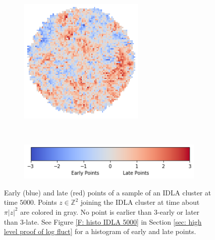 \documentclass[11pt]{article}
\numberwithin{equation}{section}
\begin{document}
\begin{figure}[H]
  \centering
  \captionsetup{width=.9\linewidth}
  \begin{subfigure} {0.85 \textwidth}
      \includegraphics[width=\linewidth]{idla_5001.png}
  \end{subfigure}
      \\
    \begin{subfigure}{0.7\textwidth}
        \includegraphics[width=\linewidth]{scale.png}
    \end{subfigure}
  \caption{Early (blue) and late (red) 
        points of a sample of an IDLA cluster at time $5000$. 
        Points $z \in \mathbb{Z}^2$ joining the IDLA cluster 
        at time about $\pi |z|^2$ are colored in gray.
        No point is earlier than $3$-early 
        or later than $3$-late.
        See Figure \ref{F: histo IDLA 5000} in Section \ref{sec: high level proof of log fluct}
        for a histogram of early and late points.}
  \label{F: IDLA 5000}
\end{figure}
\end{document}
